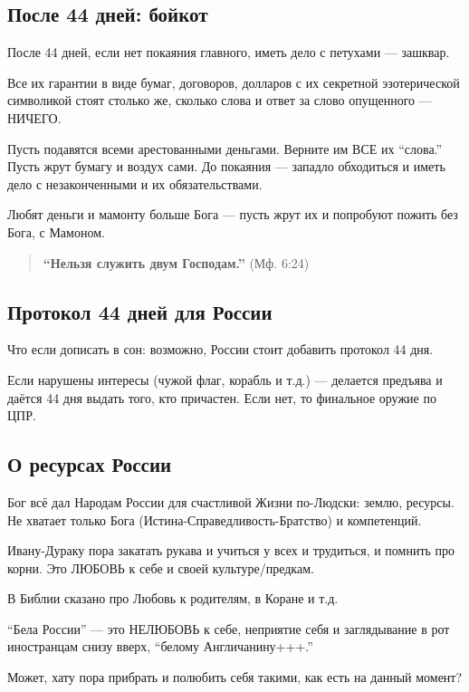 \documentclass[11pt,a4paper]{article}
\theoremstyle{definition}
\theoremstyle{remark}
\begin{document}
{\subsection{После 44 дней: бойкот}

После 44 дней, если нет покаяния главного, иметь дело с петухами — зашквар.

Все их гарантии в виде бумаг, договоров, долларов с их секретной эзотерической 
символикой стоят столько же, сколько слова и ответ за слово опущенного — НИЧЕГО.

Пусть подавятся всеми арестованными деньгами. Верните им ВСЕ их ``слова.'' Пусть 
жрут бумагу и воздух сами. До покаяния — западло обходиться и иметь дело с 
незаконченными и их обязательствами.

Любят деньги и мамонту больше Бога — пусть жрут их и попробуют пожить без Бога, 
с Мамоном.

\begin{quote}
\textbf{``Нельзя служить двум Господам.''} (Мф. 6:24)
\end{quote}

\subsection{Протокол 44 дней для России}

Что если дописать в сон: возможно, России стоит добавить протокол 44 дня.

Если нарушены интересы (чужой флаг, корабль и т.д.) — делается предъява и даётся 
44 дня выдать того, кто причастен. Если нет, то финальное оружие по ЦПР.

\subsection{О ресурсах России}

Бог всё дал Народам России для счастливой Жизни по-Людски: землю, ресурсы. Не 
хватает только Бога (Истина-Справедливость-Братство) и компетенций.

Ивану-Дураку пора закатать рукава и учиться у всех и трудиться, и помнить про 
корни. Это ЛЮБОВЬ к себе и своей культуре/предкам.

В Библии сказано про Любовь к родителям, в Коране и т.д.

``Бела России'' — это НЕЛЮБОВЬ к себе, неприятие себя и заглядывание в рот 
иностранцам снизу вверх, ``белому Англичанину+++.''

Может, хату пора прибрать и полюбить себя такими, как есть на данный момент?

}
\end{document}
